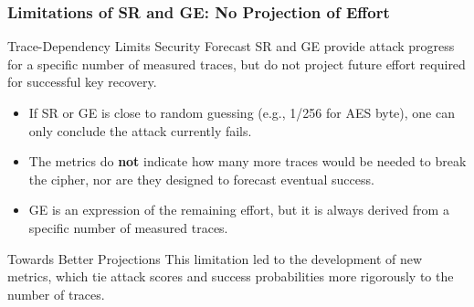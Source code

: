 \begin{frame}
    \frametitle{Limitations of SR and GE: No Projection of Effort}

    \begin{block}{Trace-Dependency Limits Security Forecast}
        SR and GE provide attack progress for a specific number of measured traces, but do not project future effort required for successful key recovery.
    \end{block}

    \begin{itemize}
        \item If SR or GE is close to random guessing (e.g., 1/256 for AES byte), one can only conclude the attack currently fails.
        \item The metrics do \textbf{not} indicate how many more traces would be needed to break the cipher, nor are they designed to forecast eventual success.
        \item GE is an expression of the remaining effort, but it is always derived from a specific number of measured traces.
    \end{itemize}

    \begin{block}{Towards Better Projections}
        This limitation led to the development of new metrics, which tie attack scores and success probabilities more rigorously to the number of traces.
    \end{block}
\end{frame}

